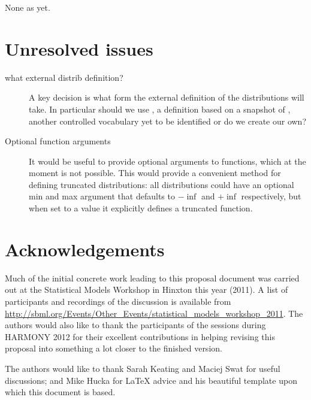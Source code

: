 \documentclass[draftspec]{sbmlpkgspec}
\begin{document}
None as yet.

\section{Unresolved issues}
\label{sec:unresolved}

\begin{description}
\item[what external distrib definition?] A key decision is what form the
  external definition of the distributions will take. In particular
  should we use \uncertml, a definition based on a snapshot of
  \uncertml, another controlled vocabulary yet to be identified or do
  we create our own?
\item[Optional function arguments] It would be useful to provide
  optional arguments to functions, which at the moment is not
  possible. This would provide a convenient method for defining
  truncated distributions: all distributions could have an optional
  min and max argument that defaults to $-\inf$ and $+\inf$
  respectively, but when set to a value it explicitly defines a
  truncated function.
\end{description}

\section{Acknowledgements}

Much of the initial concrete work leading to this proposal document
was carried out at the Statistical Models Workshop in Hinxton this
year (2011). A list of participants and recordings of the discussion
is available from
\url{http://sbml.org/Events/Other_Events/statistical_models_workshop_2011}.
The authors would also like to thank the participants of the
\distribshort sessions during HARMONY 2012 for their excellent
contributions in helping revising this proposal into something a lot
closer to the finished version.

The authors would like to thank Sarah Keating and Maciej Swat for
useful discussions; and Mike Hucka for \LaTeX{} advice and his
beautiful template upon which this document is based.



\end{document}

